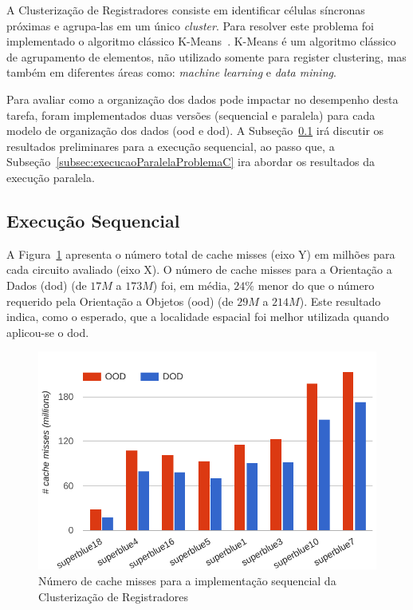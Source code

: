 A Clusterização de Registradores consiste em identificar células síncronas próximas e agrupa-las em um único \textit{cluster}. Para resolver este problema foi implementado o algoritmo clássico K-Means~\cite{selim1984k}. K-Means é um algoritmo clássico de agrupamento de elementos, não utilizado somente para register clustering, mas também em diferentes áreas como: \textit{machine learning} e \textit{data mining}.

Para avaliar como a organização dos dados pode impactar no desempenho desta tarefa, foram implementados duas versões (sequencial e paralela) para cada modelo de organização dos dados (\ac{ood} e \ac{dod}).
A Subseção~\ref{subsec:execucaoSequencialProblemaC} irá discutir os resultados preliminares para a execução sequencial, ao passo que, a Subseção~\ref{subsec:execucaoParalelaProblemaC} ira abordar os resultados da execução paralela.

\subsection{Execução Sequencial}
\label{subsec:execucaoSequencialProblemaC}

A Figura~\ref{fig:missProblemC_sequential_rtree} apresenta o número total de cache misses (eixo Y) em milhões para cada circuito avaliado (eixo X).  
O número de cache misses para a Orientação a Dados (\ac{dod}) (de $17M$ a $173M$) foi, em média, $24\%$ menor do que o número requerido pela Orientação a Objetos (\ac{ood}) (de $29M$ a $214M$).
Este resultado indica, como o esperado, que a localidade espacial foi melhor utilizada quando aplicou-se o \ac{dod}.

\begin{figure}[ht]
    \centering
    \includegraphics[width=0.7\linewidth]{img/results/missProblemC_sequential_rtree}
    \caption[Cache misses Problema~C versão sequencial]{Número de cache misses para a implementação sequencial da Clusterização de Registradores}
    \label{fig:missProblemC_sequential_rtree}
\end{figure}

